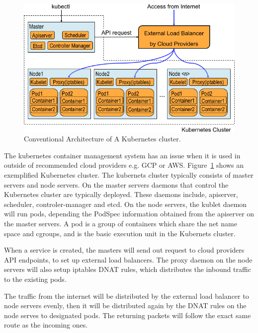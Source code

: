 \begin{figure}
\includegraphics[width=\columnwidth]{Figs/K8sConventional}
\caption{Conventional Architecture of A Kubernetes cluster.}
\label{fig:K8sConventional}
\end{figure}

The kubernetes container management system has an issue when it is used in outside of recommended cloud providers e.g. GCP or AWS.
Figure~\ref{fig:K8sConventional} shows an exemplified Kubernetes cluster.
The kubernets cluster typically consists of master servers and node servers.
On the master servers daemons that control the Kubernetes cluster are typically deployed. 
These daemons include, apiserver, scheduler, controler-manager and etcd. 
On the node servers, the kublet daemon will run pods, depending the PodSpec information obtained from the apiserver on the master servers.
A pod is a group of containers which share the net name space and cgroups, 
and is the basic execution unit in the Kubernets cluster.

When a service is created, the masters will send out request to cloud providers API endpoints, 
to set up external load balancers.
The proxy daemon on the node servers will also setup iptables DNAT\cite{MartinA.Brown2017} rules, 
which distributes the inbound traffic to the existing pods.

The traffic from the internet will be distributed by the external load balancer to node servers evenly, 
then it will be distributed again by the DNAT rules on the node serves to designated pods. 
The returning packets will follow the exact same route as the incoming ones.

